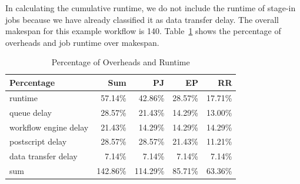  




In calculating the cumulative runtime, we do not include the runtime of stage-in jobs because we have already classified it as data transfer delay. The overall makespan for this example workflow is 140. Table~\ref{tab:model_percentage_overhead} shows the percentage of overheads and job runtime over makespan.  

\begin{table}[h!]
\caption{Percentage of Overheads and Runtime}
\label{tab:model_percentage_overhead}
\centering
\begin{tabular}{lrrrr}
\hline
Percentage & Sum & PJ & EP &RR\\

\hline

runtime & 57.14\% & 42.86\% & 28.57\% &17.71\% \\
queue delay & 28.57\% &21.43\% &14.29\% &13.00\% \\
workflow engine delay & 21.43\% &14.29\%& 14.29\% &14.29\%\\
postscript delay & 28.57\% & 28.57\% & 21.43\% & 11.21\% \\
data transfer delay & 7.14\% & 7.14\% & 7.14\% & 7.14\% \\
sum & 142.86\% & 114.29\% & 85.71\% & 63.36\%\\
\hline
\end{tabular}
\end{table} 


